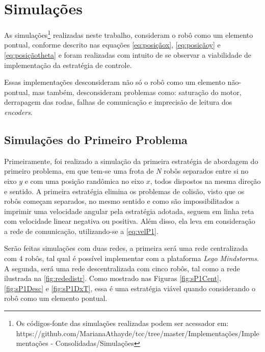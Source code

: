 \chapter{Simulações}
\label{chap:Simulacoes}

As simulações\footnote{Os códigos-fonte das simulações realizadas podem ser acessador em: https://github.com/MarianaAthayde/tcc/tree/master/Implementações/Implementações - Consolidadas/Simulações} realizadas neste trabalho, consideram o robô como um elemento pontual, conforme descrito nas equações \ref{eq:posiçãox}, \ref{eq:posiçãoy} e \ref{eq:posiçãotheta} e foram realizadas com intuito de se observar a viabilidade de implementação da estratégia de controle. 

Essas implementações desconsideram não só o robô como um elemento não-pontual, mas também, desconsideram problemas como: saturação do motor, derrapagem das rodas, falhas de comunicação e imprecisão de leitura dos \emph{encoders}. 

\section{Simulações do Primeiro Problema}
\label{sec:SimulacaoP1}

Primeiramente, foi realizado a simulação da primeira estratégia de abordagem do primeiro problema, em que tem-se uma frota de \emph{N} robôs separados entre si no eixo $y$ e com uma posição randômica no eixo $x$, todos dispostos na mesma direção e sentido. A primeira estratégia elimina os problemas de colisão, visto que os robôs começam separados, no mesmo sentido e como são impossibilitados a imprimir uma velocidade angular pela estratégia adotada, seguem em linha reta com velocidade linear negativa ou positiva. Além disso, ela leva em consideração a rede de comunicação, utilizando-se a \autoref{eq:velP1}. 

Serão feitas simulações com duas redes, a primeira será uma rede centralizada com 4 robôs, tal qual é possível implementar com a plataforma \emph{Lego Mindstorms\textregistered}. A segunda, será uma rede descentralizada com cinco robôs, tal como a rede ilustrada na \autoref{fig:rededistr}. Como mostrado nas Figuras \ref{fig:sP1Cent}, \ref{fig:sP1Desc} e \ref{fig:sP1DxT}, essa é uma estratégia viável quando considerando o robô como um elemento pontual.

